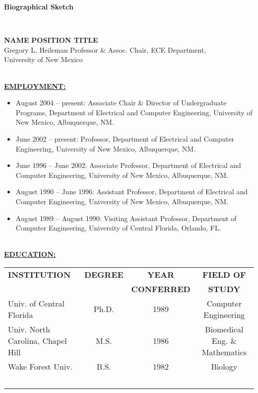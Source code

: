 \documentclass [11pt]{article}
\begin{document}
\setlength{\baselineskip}{12pt}
\newpage
\setcounter{page}{1}
\parindent 0in
\begin{center}
{\Large\bf{\sc Biographical Sketch}}
\end{center}
\vspace*{-0.1in}
{\textcolor{black}{\makebox[6.5in]{\hrulefill}} ~\\
\vspace*{-0.35in}
\begin{tabbing}
   {\bf NAME} \hspace*{2.5in} \= {\bf POSITION TITLE} \\
   Gregory L. Heileman	      \>  Professor \& Assoc. Chair, ECE Department, \\
                                                     \> University of New Mexico
\end{tabbing}
\vspace*{-0.1in}
{\textcolor{black}{\makebox[6.5in]{\hrulefill}} ~\\
\vspace*{-0.2in}
\underline{\bf EMPLOYMENT:} ~\\
\begin{itemize}
\item August 2004 -- present: Associate Chair \& Director of Undergraduate Programs, Department of Electrical and Computer Engineering, University of New Mexico, Albuquerque, NM.
\item June 2002 -- present: Professor, Department of Electrical and Computer Engineering, University of New Mexico, Albuquerque, NM.
\item June 1996 -- June 2002: Associate Professor, Department of Electrical and Computer Engineering, University of New Mexico, Albuquerque, NM.
\item August 1990 -- June 1996:  Assistant Professor, Department of Electrical and Computer Engineering, University of New Mexico, Albuquerque, NM.
\item August 1989 -- August 1990: Visiting Assistant Professor, Department of Computer Engineering, University of Central Florida, Orlando, FL.
\end{itemize}
\vspace*{-0.1in}
{\textcolor{black}{\makebox[6.5in]{\hrulefill}} ~\\

\vspace*{-0.2in}
\underline{\bf EDUCATION:} ~\\
\begin{tabular}{lccc}
{\bf INSTITUTION}  & {\bf DEGREE} & {\bf YEAR} & {\bf  FIELD OF} \\ 
                                                     &&{\bf CONFERRED} & {\bf STUDY} \\
Univ. of Central Florida & Ph.D. & 1989 & Computer Engineering \\
Univ. North Carolina, Chapel Hill & M.S. & 1986 & Biomedical Eng. \& Mathematics \\
Wake Forest Univ. & B.S.	& 1982  & Biology \\~\\
\end{tabular}

}}}
\end{document}
